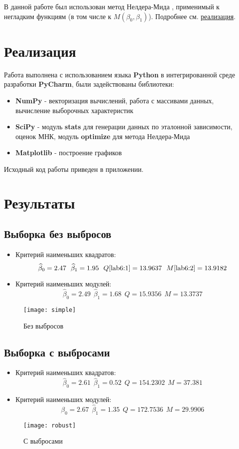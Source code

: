 \documentclass[12pt,a4paper]{article}
\begin{document}
В данной работе был использован метод Нелдера-Мида \cite{nelder}, применимый к негладким функциям (в том числе к $M\left(\beta_{0}, \beta_{1}\right)$). Подробнее см. \hyperref[sec:impl]{реализация}.
\pagebreak

\section{Реализация}
\label{sec:impl}
Работа выполнена с использованием языка \textbf{Python} в интегрированной среде разработки \textbf{PyCharm}, были задействованы библиотеки:

\begin{itemize}
	\item \textbf{NumPy} - векторизация вычислений, работа с массивами данных, вычисление выборочных характеристик
	\item \textbf{SciPy} - модуль \textbf{stats} для генерации данных по эталонной зависимости, оценок МНК, модуль \textbf{optimize} для метода Нелдера-Мида
	\item \textbf{Matplotlib} - построение графиков
\end{itemize}

Исходный код работы приведен в приложении. 
\pagebreak

\section{Результаты}
\subsection{Выборка без выбросов}
\begin{itemize}
	\item Критерий наименьших квадратов:
	$$\widehat{\beta}_0 = 2.47 \ \ \widehat{\beta}_1 = 1.95 \ \ Q\eqref{lab6:1} = 13.9637  \ \ M\eqref{lab6:2} = 13.9182$$
	\item Критерий наименьших модулей:
	$$\widehat{\beta}_0 = 2.49 \ \ \widehat{\beta}_1 = 1.68 \ \ Q = 15.9356 \ \ M = 13.3737$$
\end{itemize}
\begin{figure}[h!]
	\centering
	\texttt{[image: simple]}
	\caption{Без выбросов}
	\label{fig:image1}
\end{figure}

\pagebreak
\subsection{Выборка с выбросами}
\begin{itemize}
	\item Критерий наименьших квадратов:
	$$\widehat{\beta}_0 = 2.61 \ \ \widehat{\beta}_1 = 0.52 \ \ Q  = 154.2302  \ \ M = 37.381$$
	\item Критерий наименьших модулей:
	$$\widehat{\beta}_0 = 2.67 \ \ \widehat{\beta}_1 = 1.35 \ \ Q = 172.7536 \ \ M = 29.9906$$
\end{itemize}
\begin{figure}[h!]
	\centering
	\texttt{[image: robust]}
	\caption{С выбросами}
	\label{fig:image2}
\end{figure}
\pagebreak
\end{document}
